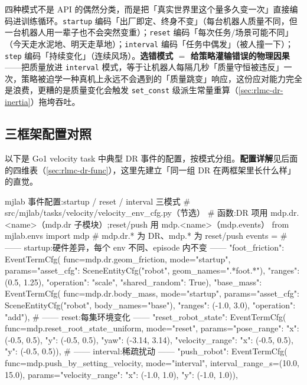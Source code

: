 \begin{insight}[模式 $=$ 把「变化频率」编码进训练]\label{ins:rlmc-dr-mode-physics}
四种模式不是 API 的偶然分类，而是把「真实世界里这个量多久变一次」直接编码进训练循环。\verb|startup| 编码「出厂即定、终身不变」（每台机器人质量不同，但一台机器人用一辈子也不会突然变重）；\verb|reset| 编码「每次任务/场景可能不同」（今天走水泥地、明天走草地）；\verb|interval| 编码「任务中偶发」（被人撞一下）；\verb|step| 编码「持续变化」（连续风场）。\textbf{选错模式 $=$ 给策略灌输错误的物理因果}——把质量放进 \verb|interval| 模式，等于让机器人每隔几秒「质量守恒被违反」一次，策略被迫学一种真机上永远不会遇到的「质量跳变」响应，这份应对能力完全是浪费，更糟的是质量变化会触发 \verb|set_const| 级派生常量重算（\cref{sec:rlmc-dr-inertia}）拖垮吞吐。
\end{insight}

\subsection{三框架配置对照}
\label{sec:rlmc-dr-mode-config}

以下是 Go1 velocity task 中典型 DR 事件的配置，按模式分组。\textbf{配置详解}见后面的四维表（\cref{sec:rlmc-dr-func}），这里先建立「同一组 DR 在两框架里长什么样」的直觉。

\begin{codebox}[Python]{mjlab 事件配置:startup / reset / interval 三模式}
# src/mjlab/tasks/velocity/velocity_env_cfg.py（节选）
# 函数:DR 项用 mdp.dr.<name>（mdp.dr 子模块）;reset/push 用 mdp.<name>（mdp.events）
from mjlab.envs import mdp                    # mdp.dr.* 为 DR、mdp.* 为 reset/push
events = {
    # —— startup:硬件差异，每个 env 不同、episode 内不变 ——
    "foot_friction": EventTermCfg(
        func=mdp.dr.geom_friction, mode="startup",
        params={"asset_cfg": SceneEntityCfg("robot", geom_names=".*foot.*"),
                "ranges": (0.5, 1.25), "operation": "scale", "shared_random": True}),
    "base_mass": EventTermCfg(
        func=mdp.dr.body_mass, mode="startup",
        params={"asset_cfg": SceneEntityCfg("robot", body_names="base"),
                "ranges": (-1.0, 3.0), "operation": "add"}),
    # —— reset:每集环境变化 ——
    "reset_robot_state": EventTermCfg(
        func=mdp.reset_root_state_uniform, mode="reset",
        params={"pose_range": {"x": (-0.5, 0.5), "y": (-0.5, 0.5),
                               "yaw": (-3.14, 3.14)},
                "velocity_range": {"x": (-0.5, 0.5), "y": (-0.5, 0.5)}}),
    # —— interval:稀疏扰动 ——
    "push_robot": EventTermCfg(
        func=mdp.push_by_setting_velocity, mode="interval",
        interval_range_s=(10.0, 15.0),
        params={"velocity_range": {"x": (-1.0, 1.0), "y": (-1.0, 1.0)}}),
}
\end{codebox}

